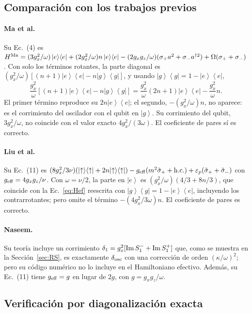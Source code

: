 \documentclass[11pt]{report}
\newcommand{\ket}[1]{\left|#1\right\rangle}
\newcommand{\bra}[1]{\left\langle#1\right|}
\newcommand{\spl}{\sigma_{+}}
\newcommand{\smi}{\sigma_{-}}
\newcommand{\Pe}{\ket{e}\!\bra{e}}
\newcommand{\Pg}{\ket{g}\!\bra{g}}
\begin{document}
\subsection{Comparaci\'on con los trabajos previos}

\paragraph{Ma et al.} Su Ec.~(4) es $H^{\rm Ma}=(3g_{x}^{2}/\omega)\Pe+(2g_{x}^{2}/\omega)n\Pe-(2g_{x}g_{z}/\omega)(\spl a^{2}+\smi a^{\dagger2})+\Omega(\spl+\smi)$. Con solo los t\'erminos rotantes, la parte diagonal es $(g_{x}^{2}/\omega)[(n+1)\Pe-n\Pg]$, y usando $\Pg=1-\Pe$,
\begin{equation}
\frac{g_{x}^{2}}{\omega}[(n+1)\Pe-n\Pg]=\frac{g_{x}^{2}}{\omega}(2n+1)\Pe-\frac{g_{x}^{2}}{\omega}n.
\end{equation}
El primer t\'ermino reproduce su $2n\Pe$; el segundo, $-(g_{x}^{2}/\omega)n$, no aparece: es el corrimiento del oscilador con el qubit en $\ket{g}$. Su corrimiento del qubit, $3g_{x}^{2}/\omega$, no coincide con el valor exacto $4g_{x}^{2}/(3\omega)$. El coeficiente de pares s\'i es correcto.

\paragraph{Liu et al.} Su Ec.~(11) es $(8g_{x}^{2}/3\nu)(|{\uparrow}\rangle\langle{\uparrow}|+2n|{\uparrow}\rangle\langle{\uparrow}|)-g_{\rm eff}(m^{2}\tilde\sigma_{+}+{\rm h.c.})+\varepsilon_{p}(\tilde\sigma_{+}+\tilde\sigma_{-})$ con $g_{\rm eff}=4g_{x}g_{z}/\nu$. Con $\omega=\nu/2$, la parte en $\ket{e}$ es $(g_{x}^{2}/\omega)(4/3+8n/3)$, que coincide con la Ec.~\eqref{eq:Hef} reescrita con $\Pg=1-\Pe$, incluyendo los contrarrotantes; pero omite el t\'ermino $-(4g_{x}^{2}/3\omega)n$. El coeficiente de pares es correcto.

\paragraph{Naseem.} Su teor\'ia incluye un corrimiento $\delta_{1}=g_{x}^{2}[{\rm Im}\,S_{1}^{-}+{\rm Im}\,S_{1}^{+}]$ que, como se muestra en la Secci\'on~\ref{sec:RS}, es exactamente $\delta_{\rm osc}$ con una correcci\'on de orden $(\kappa/\omega)^{2}$; pero su c\'odigo num\'erico no lo incluye en el Hamiltoniano efectivo. Adem\'as, su Ec.~(11) tiene $g_{\rm eff}=g$ en lugar de $2g$, con $g=g_{x}g_{z}/\omega$.

\subsection{Verificaci\'on por diagonalizaci\'on exacta}
\end{document}
